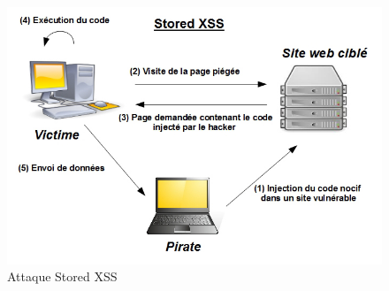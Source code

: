 \begin{figure}[!h]
	\begin{center}
		\includegraphics[scale=\scalekad]{images/xss/stored_xss}
		\caption{Attaque Stored XSS }		
		\label{stored_xss}
	\end{center}
\end{figure}


